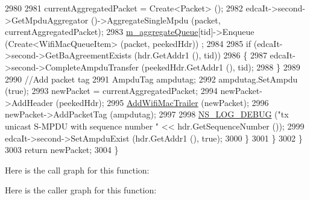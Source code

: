 \begin{DoxyCode}
2980 
2981               currentAggregatedPacket = Create<Packet> ();
2982               edcaIt->second->GetMpduAggregator ()->AggregateSingleMpdu (packet, currentAggregatedPacket);
2983               \hyperlink{classns3_1_1MacLow_a50ea30f5dff00a3ef2683b9275717c6f}{m\_aggregateQueue}[tid]->Enqueue (Create<WifiMacQueueItem> (packet, peekedHdr))
      ;
2984 
2985               \textcolor{keywordflow}{if} (edcaIt->second->GetBaAgreementExists (hdr.GetAddr1 (), tid))
2986                 \{
2987                   edcaIt->second->CompleteAmpduTransfer (peekedHdr.GetAddr1 (), tid);
2988                 \}
2989 
2990               \textcolor{comment}{//Add packet tag}
2991               AmpduTag ampdutag;
2992               ampdutag.SetAmpdu (\textcolor{keyword}{true});
2993               newPacket = currentAggregatedPacket;
2994               newPacket->AddHeader (peekedHdr);
2995               \hyperlink{classns3_1_1MacLow_acaafc67755f16f347e9161310d71e3ef}{AddWifiMacTrailer} (newPacket);
2996               newPacket->AddPacketTag (ampdutag);
2997 
2998               \hyperlink{group__logging_ga413f1886406d49f59a6a0a89b77b4d0a}{NS\_LOG\_DEBUG} (\textcolor{stringliteral}{"tx unicast S-MPDU with sequence number "} << hdr.GetSequenceNumber 
      ());
2999               edcaIt->second->SetAmpduExist (hdr.GetAddr1 (), \textcolor{keyword}{true});
3000             \}
3001         \}
3002     \}
3003   \textcolor{keywordflow}{return} newPacket;
3004 \}
\end{DoxyCode}


Here is the call graph for this function\+:




Here is the caller graph for this function\+:



